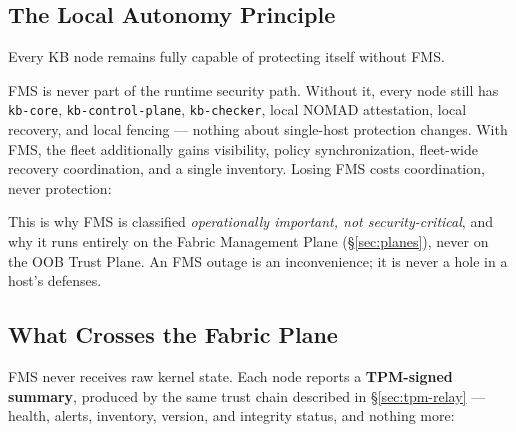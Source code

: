 \documentclass[11pt,a4paper]{article}
\begin{document}
\subsection{The Local Autonomy Principle}
\label{sec:autonomy}

\begin{notebox}
Every KB node remains fully capable of protecting itself without FMS.
\end{notebox}

FMS is never part of the runtime security path. Without it, every node
still has \texttt{kb-core}, \texttt{kb-control-plane}, \texttt{kb-checker},
local NOMAD attestation, local recovery, and local fencing --- nothing
about single-host protection changes. With FMS, the fleet additionally
gains visibility, policy synchronization, fleet-wide recovery
coordination, and a single inventory. Losing FMS costs coordination,
never protection:

\begin{center}
\end{center}

This is why FMS is classified \emph{operationally important, not
security-critical}, and why it runs entirely on the Fabric Management
Plane (\S\ref{sec:planes}), never on the OOB Trust Plane. An FMS outage
is an inconvenience; it is never a hole in a host's defenses.

\subsection{What Crosses the Fabric Plane}

FMS never receives raw kernel state. Each node reports a
\textbf{TPM-signed summary}, produced by the same trust chain described
in \S\ref{sec:tpm-relay} --- health, alerts, inventory, version, and
integrity status, and nothing more:

\begin{center}
\end{center}
\end{document}
